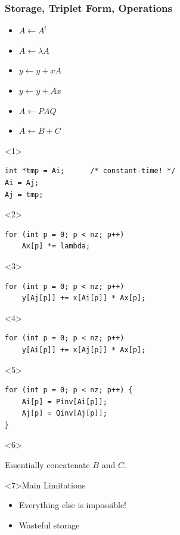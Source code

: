\documentclass[xcolor={rgb,x11names,svgnames},rgb,x11names,svgnames]{beamer}
\begin{document}
\begin{frame}[fragile]
\frametitle{Storage, Triplet Form, Operations}

\begin{itemize}
\item $A \gets A^t$
\item<2-> $A \gets \lambda A$
\item<3-> $y \gets y + x A$
\item<4-> $y \gets y + A x$
\item<5-> $A \gets P A Q$
\item<6-> $A \gets B + C$
\end{itemize}



\begin{overlayarea}{\textwidth}{3cm}
\begin{onlyenv}<1>
\begin{verbatim}
int *tmp = Ai;      /* constant-time! */
Ai = Aj;
Aj = tmp;
\end{verbatim}
\end{onlyenv}

\begin{onlyenv}<2>
\begin{verbatim}
for (int p = 0; p < nz; p++)
    Ax[p] *= lambda;
\end{verbatim}
\end{onlyenv}

\begin{onlyenv}<3>
\begin{verbatim}
for (int p = 0; p < nz; p++)
    y[Aj[p]] += x[Ai[p]] * Ax[p];       
\end{verbatim}
\end{onlyenv}

\begin{onlyenv}<4>
\begin{verbatim}
for (int p = 0; p < nz; p++)
    y[Ai[p]] += x[Aj[p]] * Ax[p];       
\end{verbatim}
\end{onlyenv}

\begin{onlyenv}<5>
\begin{verbatim}
for (int p = 0; p < nz; p++) {
    Ai[p] = Pinv[Ai[p]];
    Aj[p] = Qinv[Aj[p]];
}
\end{verbatim}
\end{onlyenv}

\begin{onlyenv}<6>
  \medskip

  Essentially concatenate $B$ and $C$.
\end{onlyenv}


\begin{alertblock}<7>{Main Limitations}
  \begin{itemize}
  \item Everything else is impossible!
  \item Wasteful storage
  \end{itemize}
\end{alertblock}

\end{overlayarea}
\end{frame}
\end{document}
